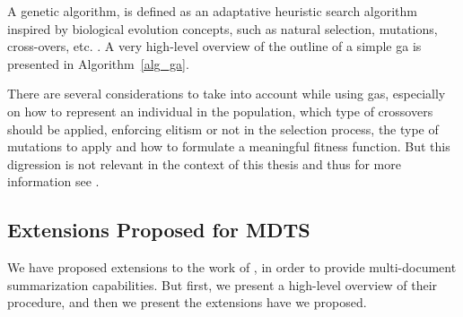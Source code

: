 \documentclass[12pt, titlepage]{uo_temp}
\makeatletter
\def\BState{\State\hskip-\ALG@thistlm}
\makeatother
\begin{document}
     A genetic algorithm, is defined as an adaptative heuristic search algorithm inspired
     by biological evolution concepts, such as natural selection, mutations, cross-overs,
     etc. \cite{eiben2008introduction}. A very high-level overview of the outline of a
     simple \gls{ga} is presented in Algorithm~\ref{alg_ga}.
     \begin{algorithm}
     \end{algorithm}
     There are several considerations to take into account while using \gls{ga}s, especially on
     how to represent an individual in the population, which type of crossovers should be
     applied, enforcing elitism or not in the selection process, the type of mutations to
     apply and how to formulate a meaningful fitness function. But this digression is not
     relevant in the context of this thesis and thus for more information see
     \cite{eiben2008introduction}.
          
     \subsection{Extensions Proposed for MDTS}
     We have proposed extensions to the work of \cite{qazvinian2008summarising}, in order
     to provide multi-document summarization capabilities. But first, we present a
     high-level overview of their procedure, and then we present the extensions have we
     proposed.

     \begin{algorithm}
     \end{algorithm}
     
\end{document}
